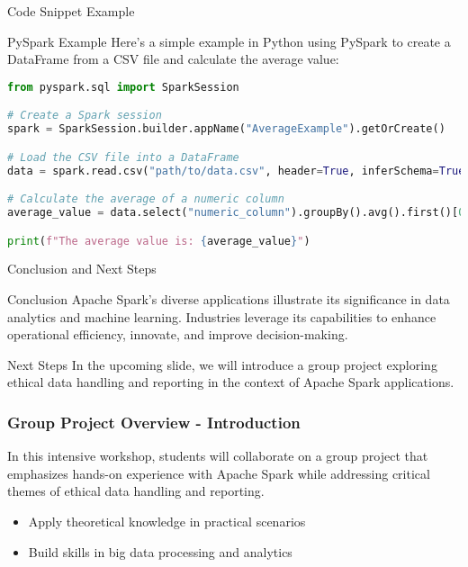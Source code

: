 \documentclass[aspectratio=169]{beamer}
\begin{document}
\begin{frame}[fragile]{Code Snippet Example}
    \begin{block}{PySpark Example}
        Here’s a simple example in Python using PySpark to create a DataFrame from a CSV file and calculate the average value:
    \end{block}
    
    \begin{lstlisting}[language=Python]
from pyspark.sql import SparkSession

# Create a Spark session
spark = SparkSession.builder.appName("AverageExample").getOrCreate()

# Load the CSV file into a DataFrame
data = spark.read.csv("path/to/data.csv", header=True, inferSchema=True)

# Calculate the average of a numeric column
average_value = data.select("numeric_column").groupBy().avg().first()[0]

print(f"The average value is: {average_value}")
    \end{lstlisting}
\end{frame}

\begin{frame}{Conclusion and Next Steps}
    \begin{block}{Conclusion}
        Apache Spark's diverse applications illustrate its significance in data analytics and machine learning.
        Industries leverage its capabilities to enhance operational efficiency, innovate, and improve decision-making.
    \end{block}
    
    \begin{block}{Next Steps}
        In the upcoming slide, we will introduce a group project exploring ethical data handling and reporting in the context of Apache Spark applications.
    \end{block}
\end{frame}

\begin{frame}[fragile]
    \frametitle{Group Project Overview - Introduction}
    In this intensive workshop, students will collaborate on a group project that emphasizes hands-on experience with Apache Spark while addressing critical themes of ethical data handling and reporting. 
    \begin{itemize}
        \item Apply theoretical knowledge in practical scenarios
        \item Build skills in big data processing and analytics
    \end{itemize}
\end{frame}
\end{document}
